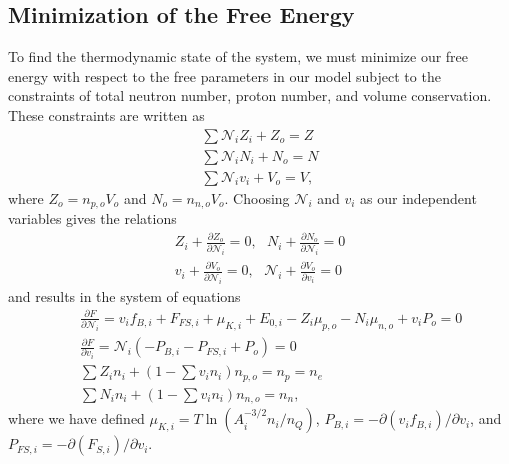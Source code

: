 \documentclass[11pt,letter]{article}
\begin{document}
\subsection{Minimization of the Free Energy}
To find the thermodynamic state of the system, we must minimize our free energy
with respect to the free parameters in our model subject to the constraints of
total neutron number, proton number, and volume conservation.  These constraints
are written as \begin{eqnarray*}
\sum \mathcal{N}_i Z_i + Z_o = Z \\
\sum \mathcal{N}_i N_i + N_o = N \\
\sum \mathcal{N}_i v_i + V_o = V, 
\end{eqnarray*}
where $Z_o = n_{p,o} V_o$ and $N_o = n_{n,o} V_o$.  Choosing $\mathcal{N}_i$ and
$v_i$ as our independent variables gives the relations \begin{eqnarray*} 
Z_i + \frac{\partial Z_o}{\partial \mathcal{N}_i} = 0, \,\, \,\,
N_i + \frac{\partial N_o}{\partial \mathcal{N}_i} = 0 \\
v_i + \frac{\partial V_o}{\partial \mathcal{N}_i} = 0, \,\, \,\,
\mathcal{N}_i + \frac{\partial V_o}{\partial v_i} = 0
\end{eqnarray*}
and results in the system of equations 
\begin{eqnarray}
\label{eq:dFdN}
&&\frac{\partial F}{\partial \mathcal{N}_i} = v_i f_{B,i} + F_{FS,i} 
+ \mu_{K,i} + E_{0,i} - Z_i \mu_{p,o} - N_i \mu_{n,o} + v_i P_o  = 0 \\
\label{eq:dFdv}
&&\frac{\partial F}{\partial v_i} = \mathcal{N}_i 
\left(- P_{B,i} - P_{FS,i} + P_{o} \right) = 0 \\ 
&&\sum Z_i n_i + \left(1-\sum v_i n_i \right) n_{p,o} = n_p = n_e \\
&&\sum N_i n_i + \left(1-\sum v_i n_i \right) n_{n,o} = n_n,
\end{eqnarray}
where we have defined $\mu_{K,i} = T \ln (A_i^{-3/2} n_i/n_Q)$, 
$P_{B,i} = -\partial (v_i f_{B,i}) / \partial v_i$, and 
$P_{FS,i} = -\partial (F_{S,i}) / \partial v_i$.
\end{document}
